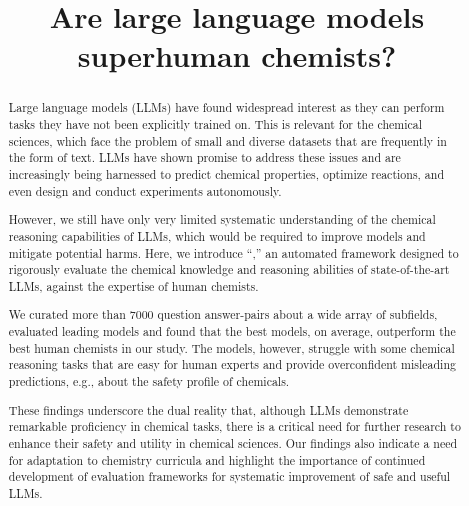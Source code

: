 \documentclass[11pt, oneside]{article}
\title{\textsf{Are large language models superhuman chemists?}}
\begin{document}
\maketitle


\clearpage
\begin{abstract}
    Large language models (LLMs) have found widespread interest as they can perform tasks they have not been explicitly trained on. 
    This is relevant for the chemical sciences, which face the problem of small and diverse datasets that are frequently in the form of text.
    LLMs have shown promise to address these issues and are increasingly being harnessed to predict chemical properties, optimize reactions, and even design and conduct experiments autonomously.

    However, we still have only very limited systematic understanding of the chemical reasoning capabilities of LLMs, which would be required to improve models and mitigate potential harms. 
    Here, we introduce \enquote{\chembench,} an automated framework designed to rigorously evaluate the chemical knowledge and reasoning abilities of state-of-the-art LLMs, against the expertise of human chemists.

    We curated more than 7000 question answer-pairs about a wide array of subfields, evaluated leading models and found that the best models, on average, outperform the best human chemists in our study. 
    The models, however, struggle with some chemical reasoning tasks that are easy for human experts and provide overconfident misleading predictions, e.g., about the safety profile of chemicals. 

    These findings underscore the dual reality that, although LLMs demonstrate remarkable proficiency in chemical tasks, there is a critical need for further research to enhance their safety and utility in chemical sciences.
    Our findings also indicate a need for adaptation to chemistry curricula and highlight the importance of continued development of evaluation frameworks for systematic improvement of safe and useful LLMs.
\end{abstract}
\end{document}
